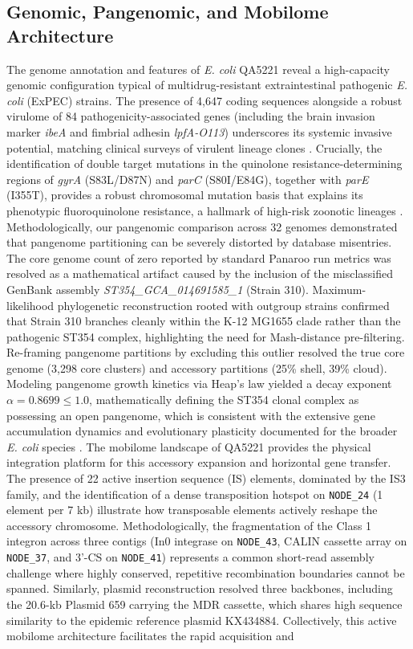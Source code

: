 \documentclass[pdflatex,sn-mathphys-num]{sn-jnl}
\begin{document}
\subsection{Genomic, Pangenomic, and Mobilome Architecture}
The genome annotation and features of \textit{E. coli} QA5221 reveal a high-capacity genomic configuration typical of multidrug-resistant extraintestinal pathogenic \textit{E. coli} (ExPEC) strains. The presence of 4,647 coding sequences alongside a robust virulome of 84 pathogenicity-associated genes (including the brain invasion marker \textit{ibeA} and fimbrial adhesin \textit{lpfA-O113}) underscores its systemic invasive potential, matching clinical surveys of virulent lineage clones \cite{marin2020expec,fuga2024hybrid}. Crucially, the identification of double target mutations in the quinolone resistance-determining regions of \textit{gyrA} (S83L/D87N) and \textit{parC} (S80I/E84G), together with \textit{parE} (I355T), provides a robust chromosomal mutation basis that explains its phenotypic fluoroquinolone resistance, a hallmark of high-risk zoonotic lineages \cite{marin2020expec,fuga2024hybrid}. Methodologically, our pangenomic comparison across 32 genomes demonstrated that pangenome partitioning can be severely distorted by database misentries. The core genome count of zero reported by standard Panaroo run metrics was resolved as a mathematical artifact caused by the inclusion of the misclassified GenBank assembly \textit{ST354\_GCA\_014691585\_1} (Strain 310). Maximum-likelihood phylogenetic reconstruction rooted with outgroup strains confirmed that Strain 310 branches cleanly within the K-12 MG1655 clade rather than the pathogenic ST354 complex, highlighting the need for Mash-distance pre-filtering. Re-framing pangenome partitions by excluding this outlier resolved the true core genome (3,298 core clusters) and accessory partitions (25\% shell, 39\% cloud). Modeling pangenome growth kinetics via Heap's law yielded a decay exponent $\alpha = 0.8699 \le 1.0$, mathematically defining the ST354 clonal complex as possessing an open pangenome, which is consistent with the extensive gene accumulation dynamics and evolutionary plasticity documented for the broader \textit{E. coli} species \cite{touchon2009organised,ghalayini2022distinct}. The mobilome landscape of QA5221 provides the physical integration platform for this accessory expansion and horizontal gene transfer. The presence of 22 active insertion sequence (IS) elements, dominated by the IS3 family, and the identification of a dense transposition hotspot on \texttt{NODE\_24} (1 element per 7 kb) illustrate how transposable elements actively reshape the accessory chromosome. Methodologically, the fragmentation of the Class 1 integron across three contigs (In0 integrase on \texttt{NODE\_43}, CALIN cassette array on \texttt{NODE\_37}, and 3'-CS on \texttt{NODE\_41}) represents a common short-read assembly challenge where highly conserved, repetitive recombination boundaries cannot be spanned. Similarly, plasmid reconstruction resolved three backbones, including the 20.6-kb Plasmid 659 carrying the MDR cassette, which shares high sequence similarity to the epidemic reference plasmid KX434884. Collectively, this active mobilome architecture facilitates the rapid acquisition and 
\end{document}
